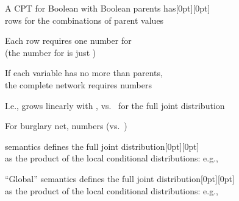 \documentclass{article}
\begin{document}
\begin{huge}

\vspace*{0.3in}

\textwidth
{}


A CPT for Boolean  with  Boolean parents has\hspace*{1.75in}\epsfxsize=1.5in\raisebox{-1.5in}[0pt][0pt]{}\\
 rows for the combinations of parent values

Each row requires one number  for \\
(the number for   is just )

If each variable has no more than  parents, \\
the complete network requires  numbers

I.e., grows linearly with , vs.~ for the full joint distribution

For burglary net,  numbers (vs.~)


 semantics defines the full joint distribution\hspace*{1.2in}\epsfxsize=1.5in\raisebox{-1.5in}[0pt][0pt]{}\\
as the product of the local conditional distributions:
\mat{\[
  P(x_1,\ldots,x_n) = \myprod_{i\eq 1}^n P(x_i|\parents(X_i))
\]}
e.g., 
\mat{\[
  =
\]}



``Global'' semantics defines the full joint distribution\hspace*{1.2in}\epsfxsize=1.5in\raisebox{-1.5in}[0pt][0pt]{}\\
as the product of the local conditional distributions:
\mat{\[
  P(x_1,\ldots,x_n) = \myprod_{i\eq 1}^n P(x_i|\parents(X_i))
\]}
e.g.,  


\end{huge}
\end{document}
